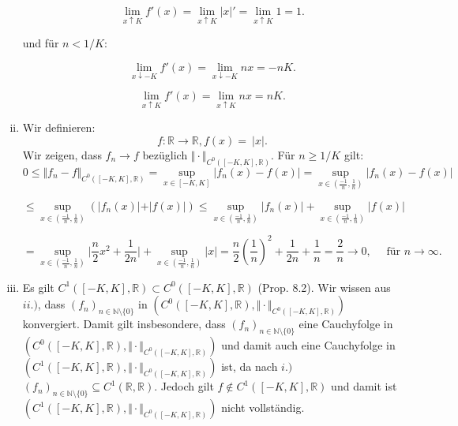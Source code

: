 \documentclass[a4paper, 20]{exam}
\newcommand\RR{\mathbb{R}}
\newcommand\NN{\mathbb{N}}
\begin{document}
\begin{solution}
\begin{enumerate}[i.)]
$$ \lim_{x \uparrow K} f'(x) 
= \lim_{x \uparrow K} \vert x \vert '
= \lim_{x \uparrow K} 1
=1.$$

und f\"ur $n < 1/K$:

$$ \lim_{x \downarrow -K} f'(x) 
= \lim_{x \downarrow -K} n x
=-nK.$$

$$ \lim_{x \uparrow K} f'(x) 
= \lim_{x \uparrow K} n x
=nK.$$
\item
Wir definieren:
$$ f: \RR \longrightarrow \RR, 
f(x)= \ \vert x \vert. $$
Wir zeigen, dass $f_n \longrightarrow f$ bez\"uglich $\Vert \cdot \Vert_{C^0([-K, K], \RR)}$. F\"ur $n\geq 1/K$ gilt:
$$0 \leq \Vert f_n - f \Vert_{C^0([-K,K], \RR)}
= \sup_{x\in [-K,K]} \vert f_n(x) - f(x) \vert
= \sup_{x\in \left(\frac{-1}{n}, \frac{1}{n}\right)} \vert f_n(x) - f(x) \vert$$

$$ \leq  \sup_{x\in \left(\frac{-1}{n}, \frac{1}{n}\right)} \left( \vert f_n(x) \vert + \vert f(x) \vert \right)
\leq \sup_{x\in \left(\frac{-1}{n}, \frac{1}{n}\right)} \vert f_n(x) \vert + \sup_{x\in \left(\frac{-1}{n}, \frac{1}{n}\right)} \vert f(x) \vert$$

$$= \sup_{x\in \left(\frac{-1}{n}, \frac{1}{n}\right)} \Big\vert \frac{n}{2}x^2 + \frac{1}{2n} \Big\vert + \sup_{x\in \left(\frac{-1}{n}, \frac{1}{n}\right)} \vert x  \vert
= \frac{n}{2}\left( \frac{1}{n} \right)^2 + \frac{1}{2n} + \frac{1}{n}
= \frac{2}{n} \longrightarrow 0, \quad \text{ f\"ur } n \longrightarrow \infty.$$
\item
Es gilt $C^1([-K,K], \RR) \subset C^0([-K,K], \RR)$ (Prop. 8.2). Wir wissen aus $ii.)$, dass $(f_n)_{n \in \NN \setminus \{0\}}$ in $(C^0([-K,K], \RR), \Vert \cdot \Vert_{C^0([-K,K], \RR)})$ konvergiert. Damit gilt insbesondere, dass $(f_n)_{n \in \NN \setminus \{0\}}$ eine Cauchyfolge in $(C^0([-K,K], \RR), \Vert \cdot \Vert_{C^0([-K,K], \RR)})$ und damit auch eine Cauchyfolge in $(C^1([-K,K], \RR), \Vert \cdot \Vert_{C^0([-K,K], \RR)})$ ist, da nach $i.)$ $(f_n)_{n \in \NN \setminus \{0\}}\subseteq C^1(\RR, \RR)$. Jedoch gilt $f\notin C^1([-K,K], \RR)$ und damit ist $(C^1([-K,K], \RR), \Vert \cdot \Vert_{C^0([-K,K], \RR)})$ nicht vollst\"andig.
\end{enumerate}
\end{solution}
\end{document}
